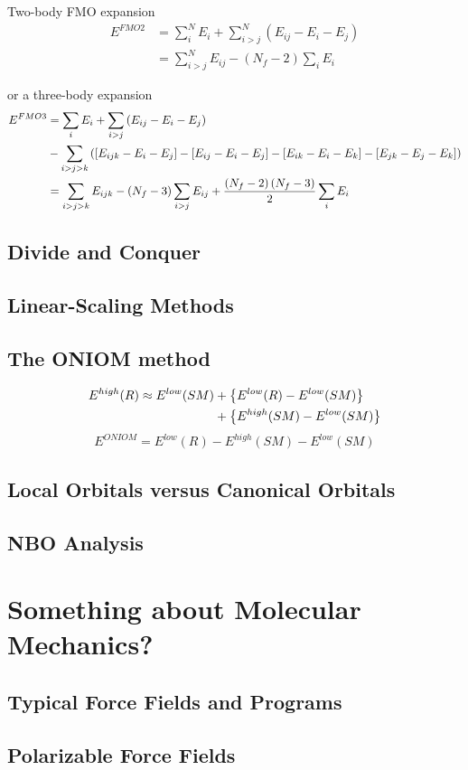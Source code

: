 Two-body FMO expansion
\begin{align}
E^{FMO2} & = \sum_i^N{E_i} + \sum_{i>j}^N{\left(E_{ij} - E_i - E_j \right)} \\
         & = \sum_{i>j}^N E_{ij} - \left( N_f - 2 \right) \sum_i E_i
\end{align}

or a three-body expansion
\begin{align}
E^{FMO3} & = \sum_{i} E_{i} + \sum_{i>j} \left(E_{ij} - E_i - E_j \right) \notag \\
   &  - \sum_{i>j>k} {\left(\left[E_{ijk} - E_i - E_j \right] - \left[E_{ij} - E_i - E_j \right] - \left[E_{ik} - E_i -  E_k\right] - \left[E_{jk} - E_j - E_k\right]\right) } \notag \\
   & = \sum_{i>j>k}E_{ijk} - \left(N_f - 3\right)\sum_{i>j}E_{ij} + \frac{\left(N_f - 2\right)\left(N_f - 3\right)}{2} \sum_i E_i
\end{align}

\subsection{Divide and Conquer}

\subsection{Linear-Scaling Methods}


\subsection{The ONIOM method}

\begin{align}
E^{high}(R) \approx E^{low}(SM) & + \left\{ E^{low}(R) - E^{low}(SM) \right\} \notag \\
                                & + \left\{ E^{high}(SM) - E^{low}(SM) \right\}
\end{align}
\begin{equation}
E^{ONIOM} = E^{low}(R) - E^{high}(SM) - E^{low}(SM)
\end{equation}

\subsection{Local Orbitals versus Canonical Orbitals}

\subsection{NBO Analysis}

\section{Something about Molecular Mechanics?}
\subsection{Typical Force Fields and Programs}
\subsection{Polarizable Force Fields}
